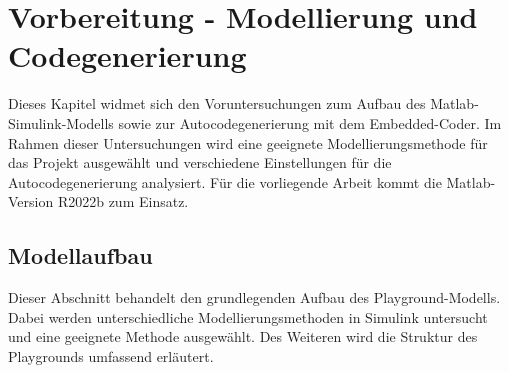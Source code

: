 \chapter{Vorbereitung - Modellierung und Codegenerierung}
\label{ch_voruntersuchungen}
Dieses Kapitel widmet sich den Voruntersuchungen zum Aufbau des Matlab-Simulink-Modells sowie zur Autocodegenerierung mit dem Embedded-Coder. Im Rahmen dieser Untersuchungen wird eine geeignete Modellierungsmethode für das Projekt ausgewählt und verschiedene Einstellungen für die Autocodegenerierung analysiert. Für die vorliegende Arbeit kommt die Matlab-Version R2022b zum Einsatz.
\section{Modellaufbau}
Dieser Abschnitt behandelt den grundlegenden Aufbau des Playground-Modells. Dabei werden unterschiedliche Modellierungsmethoden in Simulink untersucht und eine geeignete Methode ausgewählt. Des Weiteren wird die Struktur des Playgrounds umfassend erläutert.
